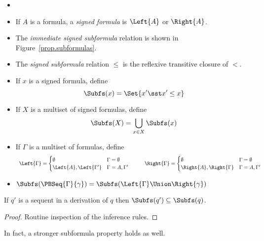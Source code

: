 \begin{definition}
  \label{prop.def.subf}
  \begin{itemize}
  \item[]
  \item If $A$ is a formula, a \emph{signed formula} is
    $\Left{A}$ or $\Right{A}$.
  \item The \emph{immediate signed subformula} relation is shown in
    Figure~\ref{prop.subformulas}.
  \item The \emph{signed subformula} relation $\le$ is the reflexive transitive
    closure of $<$.
  \item If $x$ is a signed formula,
    define
    \[ \Subfs(x) = \Set{x'\sst x'\le x} \]
  \item If $X$ is a multiset of signed formulas, define
    \[
    \Subfs(X) = \bigcup_{x\in X}\Subfs(x)
    \]
  \item If $\Gamma$ is a multiset of formulas, define
    \[
    \begin{array}{cc}
      \Left{\Gamma} =
      \begin{cases}
        \emptyset & \Gamma = \emptyset\\
        \Left{A}, \Left{\Gamma'} & \Gamma = A, \Gamma'
      \end{cases}
      &
      \hspace{2em}
      \Right{\Gamma} =
      \begin{cases}
        \emptyset & \Gamma = \emptyset\\
        \Right{A}, \Right{\Gamma} & \Gamma = A, \Gamma'
      \end{cases}
    \end{array}
    \]
  \item $\Subfs(\PBSeq{\Gamma}{\gamma}) = \Subfs(\Left{\Gamma}\Union\Right{\gamma})$
  \end{itemize}
\end{definition}

\begin{theorem}
\label{prop.thm.subformula}
If $q'$ is a sequent in a derivation of $q$ then $\Subfs(q')
\subseteq \Subfs(q)$.
\end{theorem}

\begin{proof} Routine inspection of the inference rules. \end{proof}

In fact, a stronger subformula property holds as well.

